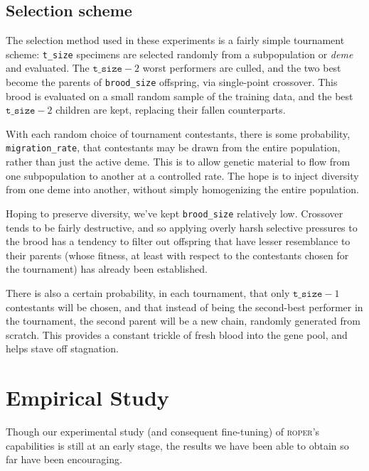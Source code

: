 \subsection{Selection scheme}

The selection method used in these experiments is a fairly simple
tournament scheme: \texttt{t\_size} specimens are selected randomly from a
subpopulation or \emph{deme} and evaluated. The
$\texttt{t\_size}-2$ worst
performers are culled, and the two best become the parents of
\texttt{brood\_size} offspring, via single-point crossover. This
brood is evaluated on a small random sample of the training data,
and the best $\texttt{t\_size} - 2$ children are kept, replacing
their fallen counterparts. 

With each random choice of tournament contestants, there is some
probability, \texttt{migration\_rate}, that contestants may be
drawn from the entire population, rather than just the active
deme. This is to allow genetic material to flow from one
subpopulation to another at a controlled rate. The hope is to
inject diversity from one deme into another, without simply
homogenizing the entire population. 

Hoping to preserve diversity, we've kept \texttt{brood\_size}
relatively low. Crossover tends to be fairly destructive, and so
applying overly harsh selective pressures to the brood has a
tendency to filter out offspring that have lesser resemblance to
their parents (whose fitness, at least with respect to the
contestants chosen for the tournament) has already been
established. 

There is also a certain probability, in each tournament, that
only $\texttt{t\_size} - 1$ contestants will be chosen, and that
instead of being the second-best performer in the tournament, the
second parent will be a new chain, randomly generated from
scratch. This provides a constant trickle of fresh blood into the
gene pool, and helps stave off stagnation.



\section{Empirical Study}

Though our experimental study (and consequent fine-tuning) of
\textsc{roper}'s capabilities is still at an early stage, the
results we have been able to obtain so far have been encouraging. 

